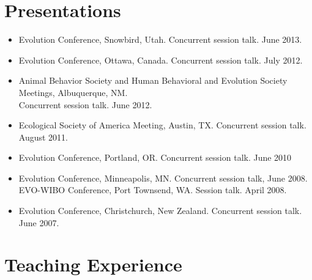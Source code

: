 \documentclass[11pt]{article}
\begin{document}
  \section{Presentations}

  \begin{itemize}
  \item Evolution Conference, Snowbird, Utah. Concurrent session talk. June 2013.
  \item Evolution Conference, Ottawa, Canada. Concurrent session talk. July 2012.
  \item Animal Behavior Society and Human Behavioral and Evolution Society Meetings, Albuquerque, NM.  \\
    Concurrent session talk.  June 2012.
  \item %
    Ecological Society of America Meeting, Austin, TX. Concurrent session talk. August 2011.
  \item %
    Evolution Conference, Portland, OR. Concurrent session talk. June 2010
  \item %
    Evolution Conference, Minneapolis, MN. Concurrent session talk, June 2008. \\
    EVO-WIBO Conference, Port Townsend, WA. Session talk. April 2008. 
  \item %
    Evolution Conference, Christchurch, New Zealand. Concurrent session talk. June 2007. 
  \end{itemize}

  \newpage
  \section{Teaching Experience}
\end{document}
